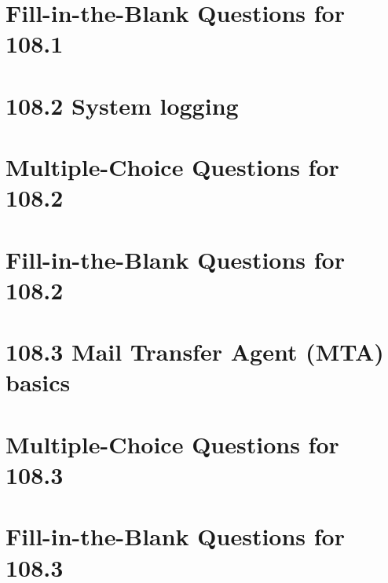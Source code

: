 \documentclass[a4paper]{report}
\begin{document}
\section*{Fill-in-the-Blank Questions for 108.1}

\newpage
\section*{108.2 System logging}

\newpage
\section*{Multiple-Choice Questions for 108.2}

\newpage
\section*{Fill-in-the-Blank Questions for 108.2}

\newpage
\section*{108.3 Mail Transfer Agent (MTA) basics}

\newpage
\section*{Multiple-Choice Questions for 108.3}

\newpage
\section*{Fill-in-the-Blank Questions for 108.3}
\end{document}
